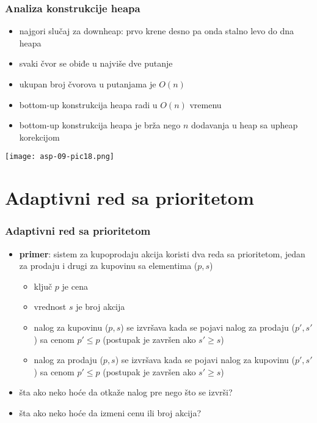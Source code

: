 \documentclass[compress]{beamer}
\begin{document}
\begin{frame}[fragile]
  \frametitle{Analiza konstrukcije heapa}
  \begin{itemize}
    \item najgori slučaj za downheap: prvo krene desno pa onda stalno levo do
    dna heapa
    \item svaki čvor se obiđe u najviše dve putanje
    \item ukupan broj čvorova u putanjama je $O(n)$
    \item bottom-up konstrukcija heapa radi u $O(n)$ vremenu
    \item bottom-up konstrukcija heapa je brža nego $n$ dodavanja u heap sa upheap korekcijom
  \end{itemize}
  \begin{center}
    \texttt{[image: asp-09-pic18.png]}
  \end{center}
\end{frame}

\section[Adaptivni RSP]{Adaptivni red sa prioritetom}
\begin{frame}[fragile]
  \frametitle{Adaptivni red sa prioritetom}
  \begin{itemize}
    \item \textbf{primer}: sistem za kupoprodaju akcija koristi dva reda sa
    prioritetom, jedan za prodaju i drugi za kupovinu sa elementima ($p, s$)
    \begin{itemize}
      \item ključ $p$ je cena
      \item vrednost $s$ je broj akcija
      \item nalog za kupovinu ($p, s$) se izvršava kada se pojavi nalog za
      prodaju ($p', s'$) sa cenom $p'\leq p$ (postupak je završen ako $s'\geq
      s$)
      \item nalog za prodaju ($p, s$) se izvršava kada se pojavi nalog za
      kupovinu ($p', s'$) sa cenom $p'\leq p$ (postupak je završen ako $s'\geq
      s$)
    \end{itemize}
    \item šta ako neko hoće da otkaže nalog pre nego što se izvrši?
    \item šta ako neko hoće da izmeni cenu ili broj akcija?
  \end{itemize}
\end{frame}
\end{document}
